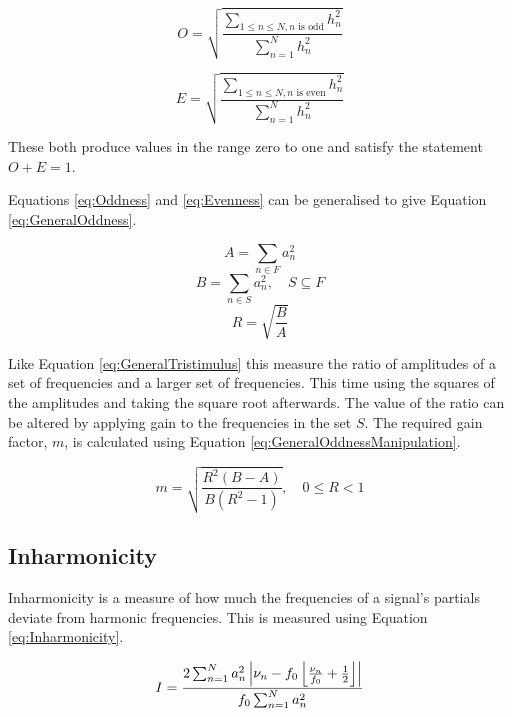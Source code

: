 		\begin{equation}
			O = \sqrt{\frac{\sum_{1 \leq n \leq N, n \textrm{ is odd}} h_{n}^{2}}
			               {\sum_{n = 1}^{N} h_{n}^{2}}}
			\label{eq:Oddness}
		\end{equation}

		\begin{equation}
			E = \sqrt{\frac{\sum_{1 \leq n \leq N, n \textrm{ is even}} h_{n}^{2}}
			               {\sum_{n = 1}^{N} h_{n}^{2}}}
			\label{eq:Evenness}
		\end{equation}

		These both produce values in the range zero to one and satisfy the statement $O + E = 1$. 

		Equations \ref{eq:Oddness} and \ref{eq:Evenness} can be generalised to give Equation
		\ref{eq:GeneralOddness}.

		\[ A = \sum_{n \in F} a_{n}^{2} \]
		\[ B = \sum_{n \in S} a_{n}^{2}, \quad S \subseteq F \]
		\begin{equation}
			R = \sqrt{\frac{B}{A}}
			\label{eq:GeneralOddness}
		\end{equation}

		Like Equation \ref{eq:GeneralTristimulus} this measure the ratio of amplitudes of a set of frequencies and
		a larger set of frequencies. This time using the squares of the amplitudes and taking the square root
		afterwards. The value of the ratio can be altered by applying gain to the frequencies in the set $S$. The
		required gain factor, $m$, is calculated using Equation \ref{eq:GeneralOddnessManipulation}.

		\begin{equation}
			m = \sqrt{\frac{R^{2}(B - A)}{B(R^{2} - 1)}}, \quad 0 \leq R < 1
			\label{eq:GeneralOddnessManipulation}
		\end{equation}

	\subsection{Inharmonicity}
	\label{sec:FetureControl-Parameterisation-Inharmonicity}
		Inharmonicity is a measure of how much the frequencies of a signal's partials deviate from harmonic
		frequencies. This is measured using Equation \ref{eq:Inharmonicity}.
		
		\begin{equation}
			I = \frac{2\sum_{n = 1}^{N}a_{n}^{2}
			           \left|\nu_{n} - f_{0}\left\lfloor\frac{\nu_{n}}{f_{0}} + \frac{1}{2}\right\rfloor\right|}
			         {f_{0}\sum_{n = 1}^{N} a_{n}^{2}}
			\label{eq:Inharmonicity}
		\end{equation}


